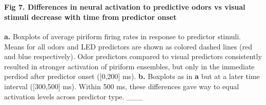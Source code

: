 \documentclass[11pt]{article}
\begin{document}
    \begin{center}
    \end{center}
    { \hspace*{\fill} \\}
    
    \paragraph{Fig 7. Differences in neural activation to predictive odors
vs visual stimuli decrease with time from predictor
onset}\label{fig-7.-differences-in-neural-activation-to-predictive-odors-vs-visual-stimuli-decrease-with-time-from-predictor-onset}

\textbf{a.} Boxplots of average piriform firing rates in response to
predictor stimuli. Means for all odors and LED predictors are shown as
colored dashed lines (red and blue respectively). Odor predictors
compared to visual predictors consistently resulted in stronger
activation of piriform ensembles, but only in the immediate perdiod
after predictor onset ({[}0,200{]} ms). \textbf{b.} Boxplots as in
\textbf{a} but at a later time interval ({[}300,500{]} ms). Within 500
ms, these differences gave way to equal activation levels across
predictor type. \_\_\_
\end{document}
